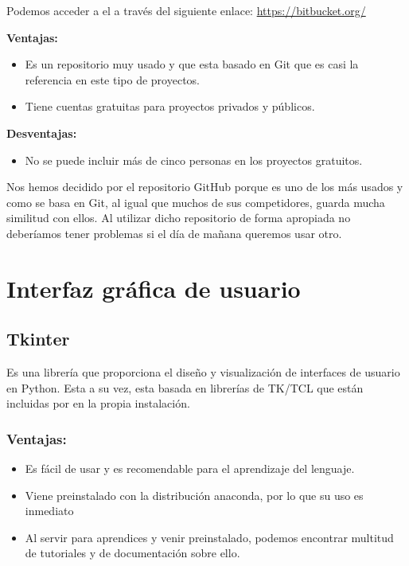 Podemos acceder a el a través del siguiente enlace: 
\url{https://bitbucket.org/}


\textbf{Ventajas:}
\begin{itemize}

\item Es un repositorio muy usado y que esta basado en Git que es casi la referencia en este tipo de proyectos.

\item Tiene cuentas gratuitas para proyectos privados y públicos.

\end{itemize}

\textbf{Desventajas:}

\begin{itemize}
\item No se puede incluir más de cinco personas en los proyectos gratuitos.
\end{itemize}

Nos hemos decidido por el repositorio GitHub porque es uno de los más usados y como se basa en Git, al igual que muchos de sus competidores, guarda mucha similitud con ellos.
Al utilizar dicho repositorio de forma apropiada no deberíamos tener problemas si el día de mañana queremos usar otro.


\section{Interfaz gráfica de usuario}
\subsection{Tkinter}
Es una librería que proporciona el diseño y visualización de interfaces de usuario en Python. Esta a su vez, esta basada en librerías de TK/TCL que están incluidas por en la propia instalación.

\subsubsection{Ventajas:}
\begin{itemize}
\item Es fácil de usar y es recomendable para el aprendizaje del lenguaje.

\item Viene preinstalado con la distribución anaconda, por lo que su uso es inmediato

\item Al servir para aprendices y venir preinstalado, podemos encontrar multitud de tutoriales y de documentación sobre ello.
\end{itemize}

